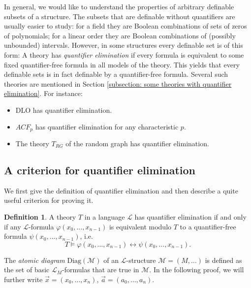 \documentclass[10pt]{amsart}
\renewcommand{\L}{\mathcal{L}}
\newcommand{\MM}{\mathcal{M}}
\theoremstyle{definition}
\newtheorem{definition}[theorem]{Definition}
\theoremstyle{remark}
\begin{document}
In general, we would like to understand the properties of arbitrary definable subsets of a structure. The subsets that are definable without quantifiers are usually easier to study: for a field they are Boolean combinations of sets of zeros of polynomials; for a linear order they are Boolean combinations of (possibly unbounded) intervals. However, in some structures every definable set is of this form: A theory has \emph{quantifier elimination} if every formula is equivalent to some fixed quantifier-free formula in all models of the theory. This yields that every definable sets is in fact definable by a quantifier-free formula. Several such theories are mentioned in Section \ref{subsection: some theories with quantifier elimination}. For instance: 

\begin{itemize} 
\item
DLO has quantifier elimination. 
\item 
$ACF_p$ has quantifier elimination for any characteristic $p$. 
\item 
The theory $T_{RG}$ of the random graph has quantifier elimination. 
\end{itemize} 

\subsection{A criterion for quantifier elimination} 
We first give the definition of quantifier elimination and then describe a quite useful criterion for proving it. 

\begin{definition} 
A theory $T$ in a language $\L$ has quantifier elimination if and only if any $\L$-formula $\varphi(x_0,\dots,x_{n-1})$ is equivalent modulo $T$ to a quantifier-free formula $\psi(x_0,\dots,x_{n-1})$, i.e. $$T\models \varphi(x_0,\dots,x_{n-1})\leftrightarrow \psi(x_0,\dots,x_{n-1}).$$ 
\end{definition} 

The \emph{atomic diagram} $\mathrm{Diag}(\MM)$ of an $\L$-structure $\MM=(M,\dots)$ is defined as the set of basic $\L_M$-formulas that are true in $\MM$. In the following proof, we will further write $\vec{x}=(x_0,\dots,x_n)$, $\vec{a}=(a_0,\dots,a_n)$. 
\end{document}
